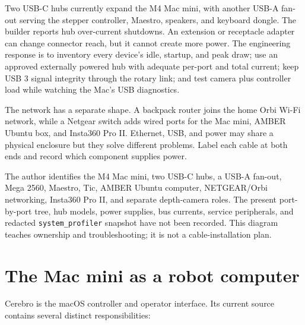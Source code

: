 \documentclass[11pt,openany]{book}
\begin{document}
\ROBUSBNETDiagram

Two USB-C hubs currently expand the M4 Mac mini, with another USB-A fan-out serving the stepper controller, Maestro, speakers, and keyboard dongle. The builder reports hub over-current shutdowns. An extension or receptacle adapter can change connector reach, but it cannot create more power. The engineering response is to inventory every device's idle, startup, and peak draw; use an approved externally powered hub with adequate per-port and total current; keep USB 3 signal integrity through the rotary link; and test camera plus controller load while watching the Mac's USB diagnostics.

The network has a separate shape. A backpack router joins the home Orbi Wi-Fi network, while a Netgear switch adds wired ports for the Mac mini, AMBER Ubuntu box, and Insta360 Pro II. Ethernet, USB, and power may share a physical enclosure but they solve different problems. Label each cable at both ends and record which component supplies power.

\begin{fieldnotebox}[title={CURRENT COMPONENTS, UNTRACED TOPOLOGY}]
The author identifies the M4 Mac mini, two USB-C hubs, a USB-A fan-out, Mega 2560, Maestro, Tic, AMBER Ubuntu computer, NETGEAR/Orbi networking, Insta360 Pro II, and separate depth-camera roles. The present port-by-port tree, hub models, power supplies, bus currents, service peripherals, and redacted \texttt{system\_profiler} snapshot have not been recorded. This diagram teaches ownership and troubleshooting; it is not a cable-installation plan.
\end{fieldnotebox}


\chapter{The Mac mini as a robot computer}

Cerebro is the macOS controller and operator interface. Its current source contains several distinct responsibilities:
\end{document}
